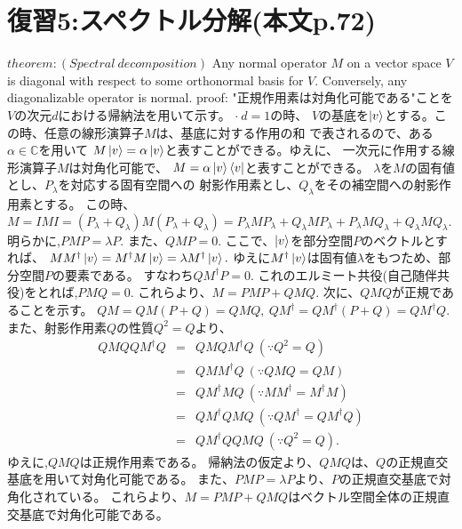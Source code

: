 \section{\Large 復習5:スペクトル分解(本文p.72)}
$theorem :(Spectral~decomposition)$
Any normal operator $M$ on a vector space $V$ is
diagonal with respect to some orthonormal basis for $V$.
Conversely, any diagonalizable operator is normal.
\newline
{\large proof:}
"正規作用素は対角化可能である"ことを
$V$の次元$d$における帰納法を用いて示す。
\newline
$\cdot ~d = 1$の時、
$V$の基底を$\ket{v}$とする。この時、任意の線形演算子$M$は、基底に対する作用の和
で表されるので、ある$\alpha \in \mathbb{C}$を用いて
$M\ket{v} = \alpha \ket{v}$と表すことができる。ゆえに、
一次元に作用する線形演算子$M$は対角化可能で、
$M = \alpha \ket{v}\bra{v}$と表すことができる。
\newline
$\lambda$を$M$の固有値とし、$P_\lambda$を対応する固有空間への
射影作用素とし、$Q_\lambda$をその補空間への射影作用素とする。
この時、$M = IMI = 
(P_\lambda  + Q_\lambda) M (P_\lambda + Q_\lambda) 
= P_\lambda MP_\lambda + Q_\lambda M P_\lambda + P_\lambda M Q_\lambda 
+ Q_\lambda M Q_\lambda .$
明らかに,$PMP = \lambda P$. また、$QMP = 0.$
ここで、$\ket{v}$を部分空間$P$のベクトルとすれば、
$MM^\dagger \ket{v} = M^\dagger M \ket{v} = \lambda M^\dagger \ket{v}.$
ゆえに$M^\dagger \ket{v}$は固有値$\lambda$をもつため、部分空間$P$の要素である。
すなわち$QM^\dagger P = 0.$
これのエルミート共役(自己随伴共役)をとれば,$PMQ = 0.$
これらより、$M = PMP + QMQ.$
\newline
次に、$QMQ$が正規であることを示す。
$QM = QM(P + Q) = QMQ,~ QM^\dagger = QM^\dagger (P + Q) = QM^\dagger Q.$
また、射影作用素$Q$の性質$Q^2 = Q$より、
\begin{eqnarray*}
QMQQM^\dagger Q &=& QMQM^\dagger Q~(\because Q^2 = Q)\\
&=& QMM^\dagger Q~(\because QMQ = QM)\\
&=&QM^\dagger M Q~(\because MM^\dagger = M^\dagger M)\\
&=& QM^\dagger QMQ~(\because QM^\dagger = QM^\dagger Q)\\
&=& QM^\dagger QQMQ~(\because Q^2 = Q).
\end{eqnarray*}
ゆえに,$QMQ$は正規作用素である。
帰納法の仮定より、$QMQ$は、$Q$の正規直交基底を用いて対角化可能である。
また、$PMP = \lambda P$より、$P$の正規直交基底で対角化されている。
これらより、$M = PMP + QMQ$はベクトル空間全体の正規直交基底で対角化可能である。

